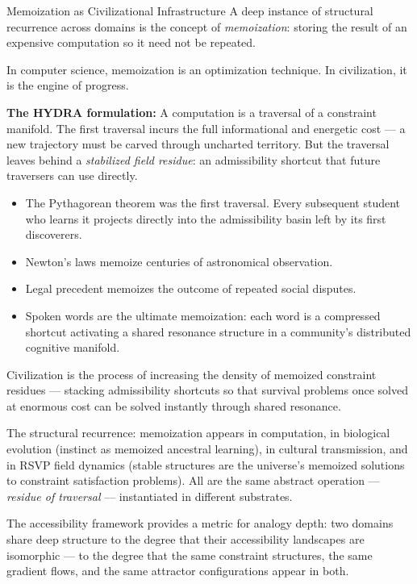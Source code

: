 \begin{conceptaside}{Memoization as Civilizational Infrastructure}
  A deep instance of structural recurrence across domains is the concept
  of \emph{memoization}: storing the result of an expensive computation
  so it need not be repeated.

  In computer science, memoization is an optimization technique.
  In civilization, it is the engine of progress.

  \textbf{The HYDRA formulation:} A computation is a traversal of a
  constraint manifold. The first traversal incurs the full informational
  and energetic cost — a new trajectory must be carved through uncharted
  territory. But the traversal leaves behind a \emph{stabilized field
  residue}: an admissibility shortcut that future traversers can use
  directly.

  \begin{itemize}
    \item The Pythagorean theorem was the first traversal. Every subsequent
          student who learns it projects directly into the admissibility basin
          left by its first discoverers.
    \item Newton's laws memoize centuries of astronomical observation.
    \item Legal precedent memoizes the outcome of repeated social disputes.
    \item Spoken words are the ultimate memoization: each word is a
          compressed shortcut activating a shared resonance structure in
          a community's distributed cognitive manifold.
  \end{itemize}

  Civilization is the process of increasing the density of memoized
  constraint residues — stacking admissibility shortcuts so that survival
  problems once solved at enormous cost can be solved instantly through
  shared resonance.

  The structural recurrence: memoization appears in computation, in
  biological evolution (instinct as memoized ancestral learning), in
  cultural transmission, and in RSVP field dynamics (stable structures
  are the universe's memoized solutions to constraint satisfaction problems).
  All are the same abstract operation — \emph{residue of traversal} —
  instantiated in different substrates.
\end{conceptaside}


The accessibility framework provides a metric for analogy depth:
two domains share deep structure to the degree that their accessibility
landscapes are isomorphic — to the degree that the same constraint
structures, the same gradient flows, and the same attractor configurations
appear in both.

